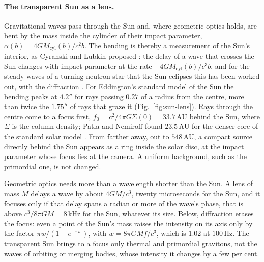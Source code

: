 \paragraph{The transparent Sun as a lens.} Gravitational waves pass through
the Sun and, where geometric optics holds, are bent by the mass inside the
cylinder of their impact parameter, $\alpha(b) = 4GM_{\mathrm{cyl}}(b)/c^2 b$.
The bending is thereby a measurement of the Sun's interior, as Cyranski and
Lubkin proposed \cite{CyranskiLubkin1974}: the delay of a wave that crosses
the Sun changes with impact parameter at the rate
$-4GM_{\mathrm{cyl}}(b)/c^3b$, and for the steady waves of a turning neutron
star that the Sun eclipses this has been worked out, with the diffraction
\cite{MarchantEtAl2020,TakahashiMorisakiSuyama2023,JungKim2023}.
For Eddington's standard model of the Sun the bending peaks at $4.2''$ for
rays passing $0.27$ of a radius from the centre, more than twice the
$1.75''$ of rays that graze it (Fig.~\ref{fig:sun-lens}). Rays through the
centre come to a focus first, $f_0 = c^2/4\pi G\Sigma(0) = 33.7\,\mathrm{AU}$ behind
the Sun, where $\Sigma$ is the column density; Patla and Nemiroff found
$23.5\,\mathrm{AU}$ for the denser core of the standard solar model
\cite{PatlaNemiroff2008}. From farther away, out to $548\,\mathrm{AU}$, a compact source directly behind
the Sun appears as a ring inside the solar disc, at the impact parameter
whose focus lies at the camera. A uniform background, such as the primordial
one, is not changed.

Geometric optics needs more than a wavelength shorter than the Sun. A lens of
mass $M$ delays a wave by about $4GM/c^3$, twenty microseconds for the Sun, and
it focuses only if that delay spans a radian or more of the wave's phase, that
is above $c^3/8\pi GM = 8\,\mathrm{kHz}$ for the Sun, whatever its size. Below,
diffraction erases the focus: even a point of the Sun's mass raises the
intensity on its axis only by the factor $\pi w/(1 - e^{-\pi w})$, with $w =
8\pi GMf/c^3$, which is $1.02$ at $100\,\mathrm{Hz}$. The transparent Sun
brings to a focus only thermal and primordial gravitons, not the waves of
orbiting or merging bodies, whose intensity it changes by a few per cent.

